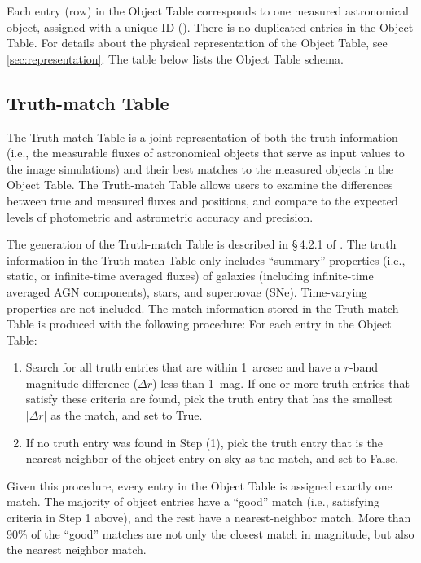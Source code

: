 \documentclass[11pt]{report}
\begin{document}
Each entry (row) in the Object Table corresponds to one measured astronomical object, assigned with a unique ID (). There is no duplicated entries in the Object Table. For details about the physical representation of the Object Table, see \autoref{sec:representation}. The table below lists the Object Table schema. 


\subsection{Truth-match Table}
\label{sec:truth}

The Truth-match Table is a joint representation of both the truth information (i.e., the measurable fluxes of astronomical objects that serve as input values to the image simulations) and their best matches to the measured objects in the Object Table. The Truth-match Table allows users to examine the differences between true and measured fluxes and positions, and compare to the expected levels of photometric and astrometric accuracy and precision.

The generation of the Truth-match Table is described in \S\,4.2.1 of \cite{2020arXiv201005926L}. The truth information in the Truth-match Table only includes ``summary'' properties (i.e., static, or infinite-time averaged fluxes) of galaxies (including infinite-time averaged AGN components), stars, and supernovae (SNe). Time-varying properties are not included. The match information stored in the  Truth-match Table is produced with the following procedure: For each entry in the Object Table:
\begin{enumerate}
    \item Search for all truth entries that are within 1~arcsec and have a $r$-band magnitude difference ($\Delta r$) less than 1~mag. If one or more truth entries that satisfy these criteria are found, pick the truth entry that has the smallest $|\Delta r|$ as the match, and set  to True.
    \item If no truth entry was found in Step (1), pick the truth entry that is the nearest neighbor of the object entry on sky as the match, and set  to False.
\end{enumerate}
Given this procedure, every entry in the Object Table is assigned exactly one match. The majority of object entries have a ``good'' match (i.e., satisfying criteria in Step 1 above), and the rest have a nearest-neighbor match. More than 90\% of the ``good'' matches are not only the closest match in magnitude, but also the nearest neighbor match. 
\end{document}
